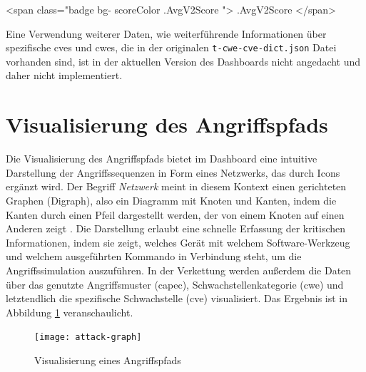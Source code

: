 \begin{code}[caption=Aufbau eines \gls{html} Elements zur Darstellung eines CVSS Werts in einer Bootstrap Komponente, label={listing:template-cvss}]
    <span class="badge bg-{{ scoreColor .AvgV2Score }}">{{ .AvgV2Score }}</span>
\end{code}

Eine Verwendung weiterer Daten, wie weiterführende Informationen über spezifische \glspl{cve} und \glspl{cwe}, die in der originalen \verb|t-cwe-cve-dict.json| Datei vorhanden sind, ist in der aktuellen Version des Dashboards nicht angedacht und daher nicht implementiert.

\section{Visualisierung des Angriffspfads}
\label{sec:impl-visualisierungDesAngriffspfads}
Die Visualisierung des Angriffspfads bietet im Dashboard eine intuitive Darstellung der Angriffssequenzen in Form eines Netzwerks, das durch Icons ergänzt wird. Der Begriff \textit{Netzwerk} meint in diesem Kontext einen gerichteten Graphen (Digraph), also ein Diagramm mit Knoten und Kanten, indem die Kanten durch einen Pfeil dargestellt werden, der von einem Knoten auf einen Anderen zeigt \autocite{DigraphDefinition}. Die Darstellung erlaubt eine schnelle Erfassung der kritischen Informationen, indem sie zeigt, welches Gerät mit welchem Software-Werkzeug und welchem ausgeführten Kommando in Verbindung steht, um die Angriffssimulation auszuführen. In der Verkettung werden außerdem die Daten über das genutzte Angriffsmuster (\gls{capec}), Schwachstellenkategorie (\gls{cwe}) und letztendlich die spezifische Schwachstelle (\gls{cve}) visualisiert. Das Ergebnis ist in Abbildung \ref{fig:attack-graph} veranschaulicht.
\begin{figure}
    \centering
    \texttt{[image: attack-graph]}
    \caption{Visualisierung eines Angriffspfads}
    \label{fig:attack-graph}
\end{figure}

